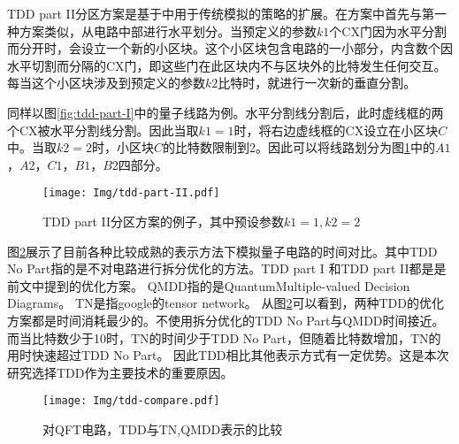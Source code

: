 TDD part II分区方案是基于\citep{huang2020classical}中用于传统模拟的策略的扩展。在方案中首先与第一种方案类似，从电路中部进行水平划分。当预定义的参数$k1$个CX门因为水平分割而分开时，会设立一个新的小区块。这个小区块包含电路的一小部分，内含数个因水平切割而分隔的CX门，即这些门在此区块内不与区块外的比特发生任何交互。每当这个小区块涉及到预定义的参数$k2$比特时，就进行一次新的垂直分割。
\begin{example}
    同样以图\ref{fig:tdd-part-I}中的量子线路为例。水平分割线分割后，此时虚线框的两个CX被水平分割线分割。因此当取\(k1=1\)时，将右边虚线框的CX设立在小区块\(C\)中。当取\(k2=2\)时，小区块\(C\)的比特数限制到2。因此可以将线路划分为图\ref{fig:tdd-part-II}中的\(A1\)，\(A2\)，\(C1\)，\(B1\)，\(B2\)四部分。
\begin{figure}[!htbp]
    \centering
    \texttt{[image: Img/tdd-part-II.pdf]}
    \caption{TDD part II分区方案的例子，其中预设参数\(k1=1,k2=2\)}
    \label{fig:tdd-part-II}
\end{figure}
\end{example}

 
图\ref{fig:tdd-compare}展示了目前各种比较成熟的表示方法下模拟量子电路的时间对比。其中TDD No Part指的是不对电路进行拆分优化的方法。TDD part I 和TDD part II都是是前文中提到的优化方案。
QMDD指的是QuantumMultiple-valued Decision Diagrams。
TN是指google的tensor network。
从图\ref{fig:tdd-compare}可以看到，两种TDD的优化方案都是时间消耗最少的。不使用拆分优化的TDD No Part与QMDD时间接近。而当比特数少于10时，TN的时间少于TDD No Part，但随着比特数增加，TN的用时快速超过TDD No Part。
因此TDD相比其他表示方式有一定优势。这是本次研究选择TDD作为主要技术的重要原因。

\begin{figure}[!htbp]
    \centering
    \texttt{[image: Img/tdd-compare.pdf]}
    \caption{对QFT电路，TDD与TN,QMDD表示的比较\citep{Hong_2022}}
    \label{fig:tdd-compare}
\end{figure}

